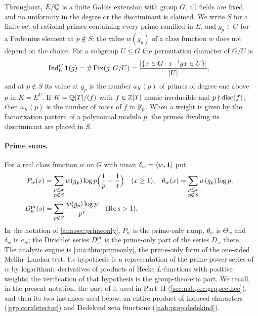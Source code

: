 Throughout, $E/\Q$ is a finite Galois extension with group $G$, all fields are fixed, and no
uniformity in the degree or the discriminant is claimed. We write $S$ for a finite set of
rational primes containing every prime ramified in $E$, and $g_p\in G$ for a Frobenius
element at $p\notin S$; the value $w(g_p)$ of a class function $w$ does not depend on the
choice. For a subgroup $U\le G$ the permutation character of $G/U$ is
\[
 \Ind_U^G\nabone(g)=\#\nabFix(g,G/U)=\frac{\abs{\set{x\in G: x^{-1}gx\in U}}}{\abs{U}},
\]
and at $p\notin S$ its value at $g_p$ is the number $a_K(p)$ of primes of degree one above
$p$ in $K=E^U$. If $K=\Q[T]/(f)$ with $f\in\Z[T]$ monic irreducible and $p\nmid\disc(f)$,
then $a_K(p)$ is the number of roots of $f$ in $\F_p$. When a weight is given by the
factorization pattern of a polynomial modulo $p$, the primes dividing its discriminant are
placed in $S$.

\paragraph{Prime sums.}
For a real class function $w$ on $G$ with mean $\delta_w=\langle w,\nabone\rangle$ put
\begin{align*}
 P_w(x)&=\sum_{\substack{p\le x\\ p\notin S}}w(g_p)\log p\Bigl(\frac1p-\frac1x\Bigr)\quad(x\ge1),
 &
 \theta_w(x)&=\sum_{\substack{p\le x\\ p\notin S}}w(g_p)\log p,\\
 D^{\mathrm{pr}}_w(s)&=\sum_{p\notin S}\frac{w(g_p)\log p}{p^{s}}\quad(\Re s>1). &&
\end{align*}
In the notation of \cref{ana:sec:primeonly}, $P_w$ is the prime-only ramp, $\theta_w$ is
$\Theta_w$ and $\delta_w$ is $a_w$; the Dirichlet series $D^{\mathrm{pr}}_w$ is the
prime-only part of the series $D_w$ there. The analytic engine is \cref{ana:thm:primeonly},
the prime-only form of the one-sided Mellin--Landau test. Its hypothesis is a
representation of the prime-power series of $w$ by logarithmic derivatives of products of
Hecke $L$-functions with positive weights; the verification of that hypothesis is the
group-theoretic part. We recall, in the present notation, the part of it used in Part~II
(\cref{sec:nab,sec:grp,sec:hec}), and then its two instances used below: an entire product
of induced characters (\cref{grp:cor:detector}) and Dedekind zeta functions
(\cref{nab:prop:dedekind}).

